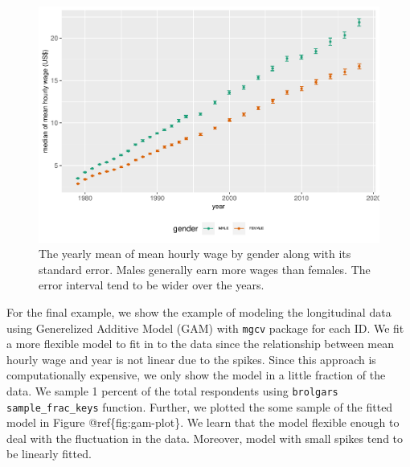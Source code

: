 \begin{Schunk}
\begin{figure}
\includegraphics{figures/gender-se-1} \caption[The yearly mean of mean hourly wage by gender along with its standard error]{The yearly mean of mean hourly wage by gender along with its standard error. Males generally earn more wages than females. The error interval tend to be wider over the years.}\label{fig:gender-se}
\end{figure}
\end{Schunk}

For the final example, we show the example of modeling the longitudinal
data using Generelized Additive Model (GAM) with \texttt{mgcv} package
\citep{mgcv} for each ID. We fit a more flexible model to fit in to the
data since the relationship between mean hourly wage and year is not
linear due to the spikes. Since this approach is computationally
expensive, we only show the model in a little fraction of the data. We
sample 1 percent of the total respondents using
\texttt{brolgar\textquotesingle{}s} \texttt{sample\_frac\_keys}
function. Further, we plotted the some sample of the fitted model in
Figure @ref\{fig:gam-plot\}. We learn that the model flexible enough to
deal with the fluctuation in the data. Moreover, model with small spikes
tend to be linearly fitted.


